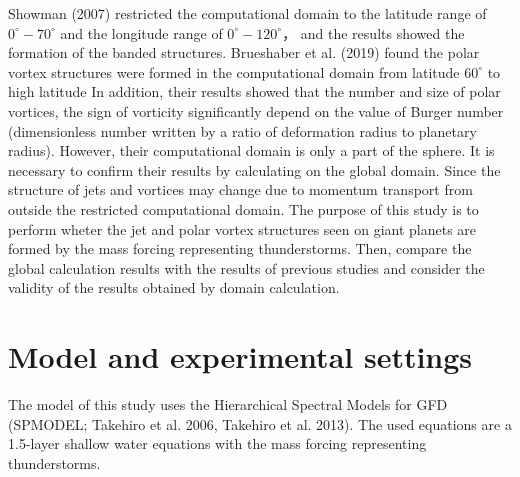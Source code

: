 \documentclass[a4j,multicol,8pt]{jarticle}
\begin{document}
\begin{multicols}{2}
%
%
Showman (2007) restricted the computational domain to the latitude range of
$0^\circ - 70^\circ$ and the longitude range of $0^\circ - 120^\circ$，
and the results showed the formation of the banded structures.
%
Brueshaber et al. (2019) found the polar vortex structures were formed
in the computational domain from latitude $60^\circ$ to high latitude
%
In addition, their results showed
that the number and size of polar vortices,
the sign of vorticity significantly depend on
the value of Burger number (dimensionless number written
by a ratio of deformation radius to planetary radius).
%
However, their computational domain is only a part of the sphere.
It is necessary to confirm their results by calculating on the global domain.
Since the structure of jets and vortices may change due to momentum transport from
outside the restricted computational domain.
%
The purpose of this study is to perform
wheter the jet and polar vortex structures seen on giant planets are
formed by the mass forcing representing thunderstorms.
%
Then, compare the global calculation results with the results of previous studies
and consider the validity of the results obtained by domain calculation.
\vspace{-2zh}
\section{Model and experimental settings}
\vspace{-0.8zh}
The model of this study uses the Hierarchical Spectral Models for GFD (SPMODEL; Takehiro et al. 2006, Takehiro et al. 2013).
%
The used equations are a 1.5-layer shallow water equations
with the mass forcing representing thunderstorms.
%
\vspace{-2zh}

\end{multicols}
\end{document}
